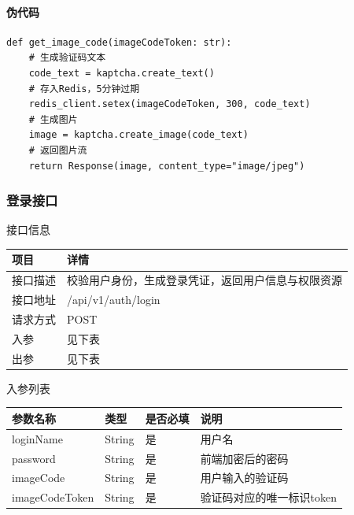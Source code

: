 \documentclass[12pt, a4paper]{article}
\begin{document}
\newpage
\paragraph{伪代码}
\begin{verbatim}
def get_image_code(imageCodeToken: str):
    # 生成验证码文本
    code_text = kaptcha.create_text()
    # 存入Redis，5分钟过期
    redis_client.setex(imageCodeToken, 300, code_text)
    # 生成图片
    image = kaptcha.create_image(code_text)
    # 返回图片流
    return Response(image, content_type="image/jpeg")
\end{verbatim}

\subsubsection{登录接口}
\begin{center}
   接口信息
\end{center}
\begin{table}[H]
    \centering
    \begin{tabular}{|l|l|}
        \hline
        项目 & 详情 \\
        \hline
        接口描述 & 校验用户身份，生成登录凭证，返回用户信息与权限资源 \\
        \hline
        接口地址 & /api/v1/auth/login \\
        \hline
        请求方式 & POST \\
        \hline
        入参 & 见下表 \\
        \hline
        出参 & 见下表 \\
        \hline
    \end{tabular}
\end{table}

入参列表

\begin{table}[H]
    \centering
    \begin{tabular}{|l|l|l|l|}
        \hline
        参数名称 & 类型 & 是否必填 & 说明 \\
        \hline
        loginName & String & 是 & 用户名 \\
        \hline
        password & String & 是 & 前端加密后的密码 \\
        \hline
        imageCode & String & 是 & 用户输入的验证码 \\
        \hline
        imageCodeToken & String & 是 & 验证码对应的唯一标识token \\
        \hline
    \end{tabular}
\end{table}
\end{document}
